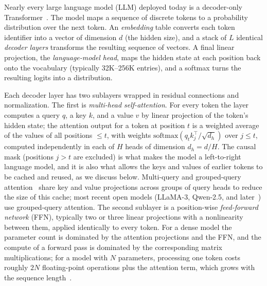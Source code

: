 Nearly every large language model (LLM) deployed today is a decoder-only Transformer~\cite{vaswani,radford2019language,brown2020language}.
The model maps a sequence of discrete tokens to a probability distribution over the next token.
An \emph{embedding} table converts each token identifier into a vector of dimension $d$ (the hidden size), and a stack of $L$ identical \emph{decoder layers} transforms the resulting sequence of vectors.
A final linear projection, the \emph{language-model head}, maps the hidden state at each position back onto the vocabulary (typically 32K--256K entries), and a softmax turns the resulting logits into a distribution.

Each decoder layer has two sublayers wrapped in residual connections and normalization.
The first is \emph{multi-head self-attention}.
For every token the layer computes a query $q$, a key $k$, and a value $v$ by linear projection of the token's hidden state; the attention output for a token at position $t$ is a weighted average of the values of all positions $\le t$, with weights $\mathrm{softmax}(q_t k_j^{\top}/\sqrt{d_h})$ over $j \le t$, computed independently in each of $H$ heads of dimension $d_h = d/H$.
The causal mask (positions $j > t$ are excluded) is what makes the model a left-to-right language model, and it is also what allows the keys and values of earlier tokens to be cached and reused, as we discuss below.
Multi-query and grouped-query attention~\cite{shazeer2019fast,ainslie2023gqa} share key and value projections across groups of query heads to reduce the size of this cache; most recent open models (LLaMA-3, Qwen-2.5, and later~\cite{llama3,qwen2025qwen25technicalreport}) use grouped-query attention.
The second sublayer is a position-wise \emph{feed-forward network} (FFN), typically two or three linear projections with a nonlinearity between them, applied identically to every token.
For a dense model the parameter count is dominated by the attention projections and the FFN, and the compute of a forward pass is dominated by the corresponding matrix multiplications; for a model with $N$ parameters, processing one token costs roughly $2N$ floating-point operations plus the attention term, which grows with the sequence length~\cite{kaplan2020scaling,pope2023efficiently}.

